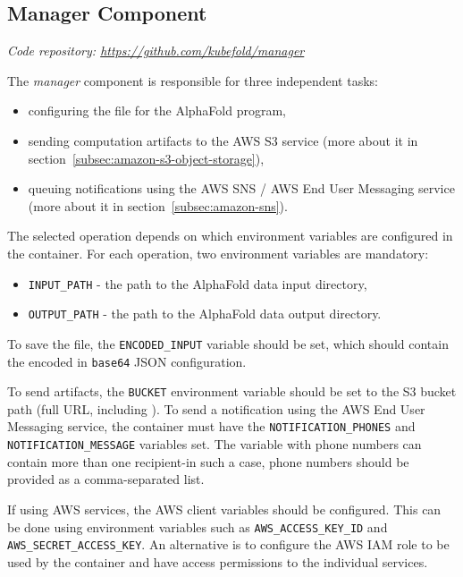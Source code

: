 \subsection{Manager Component}\label{subsec:component-manager}
\textit{Code repository: \url{https://github.com/kubefold/manager}}

The \textit{manager} component is responsible for three independent tasks:
\begin{itemize}
    \item configuring the  file for the AlphaFold program,
    \item sending computation artifacts to the AWS S3 service (more about it in section~\ref{subsec:amazon-s3-object-storage}),
    \item queuing notifications using the AWS SNS / AWS End User Messaging service (more about it in section~\ref{subsec:amazon-sns}).
\end{itemize}

The selected operation depends on which environment variables are configured in the container.
For each operation, two environment variables are mandatory:
\begin{itemize}
    \item \texttt{INPUT\_PATH} - the path to the AlphaFold data input directory,
    \item \texttt{OUTPUT\_PATH} - the path to the AlphaFold data output directory.
\end{itemize}

To save the  file, the \texttt{ENCODED\_INPUT} variable should be set, which should contain the encoded in \texttt{base64} JSON configuration.

To send artifacts, the \texttt{BUCKET} environment variable should be set to the S3 bucket path (full URL, including ).
To send a notification using the AWS End User Messaging service, the container must have the \texttt{NOTIFICATION\_PHONES} and \texttt{NOTIFICATION\_MESSAGE} variables set.
The variable with phone numbers can contain more than one recipient-in such a case, phone numbers should be provided as a comma-separated list.

If using AWS services, the AWS client variables should be configured.
This can be done using environment variables such as \texttt{AWS\_ACCESS\_KEY\_ID} and \texttt{AWS\_SECRET\_ACCESS\_KEY}.
An alternative is to configure the AWS IAM role to be used by the container and have access permissions to the individual services.